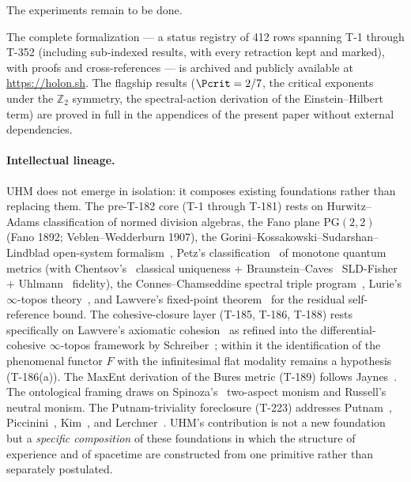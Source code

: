 The experiments remain to be done.

The complete formalization --- a status registry of 412 rows spanning T-1
through T-352 (including sub-indexed results, with every retraction kept and
marked), with proofs and cross-references ---
is archived and publicly available at \url{https://holon.sh}.
The flagship results ($\Pcrit = 2/7$, the critical exponents under the
$\mathbb{Z}_2$ symmetry, the spectral-action derivation of the Einstein--Hilbert
term) are proved in full in the appendices of the
present paper without external dependencies.

\paragraph{Intellectual lineage.} UHM does not emerge in isolation: it composes
existing foundations rather than replacing them. The pre-T-182 core (T-1
through T-181) rests on Hurwitz--Adams classification of normed division
algebras, the Fano plane $\mathrm{PG}(2,2)$ (Fano 1892; Veblen--Wedderburn
1907), the Gorini--Kossakowski--Sudarshan--Lindblad open-system
formalism~\cite{goderis1989}, Petz's classification~\cite{petz1996} of
monotone quantum metrics (with Chentsov's~\cite{chentsov1982} classical
uniqueness + Braunstein--Caves~\cite{braunstein1994} SLD-Fisher +
Uhlmann~\cite{uhlmann1976} fidelity), the Connes--Chamseddine spectral
triple program~\cite{connes1996,chamseddine2007,connes2008reconstruction},
Lurie's $\infty$-topos theory~\cite{lurie2009}, and Lawvere's fixed-point
theorem~\cite{lawvere1969} for the residual self-reference bound. The
cohesive-closure layer (T-185, T-186, T-188) rests specifically on Lawvere's
axiomatic cohesion~\cite{lawvere1973} as refined into the differential-cohesive
$\infty$-topos framework by Schreiber~\cite{schreiber2013}; within it the
identification of the phenomenal functor $F$ with the infinitesimal flat modality
remains a hypothesis (T-186(a)). The MaxEnt derivation of the Bures metric (T-189)
follows Jaynes~\cite{jaynes1957}. The ontological framing draws on
Spinoza's~\cite{spinoza1677} two-aspect monism and
Russell's~\cite{russell1927} neutral monism. The Putnam-triviality foreclosure
(T-223) addresses Putnam~\cite{putnam1988},
Piccinini~\cite{piccinini2008}, Kim~\cite{kim2005}, and
Lerchner~\cite{lerchner2026abstraction}. UHM's contribution is not a new
foundation but a \emph{specific composition} of these foundations in which
the structure of experience and of spacetime are constructed from one primitive
rather than separately postulated.
